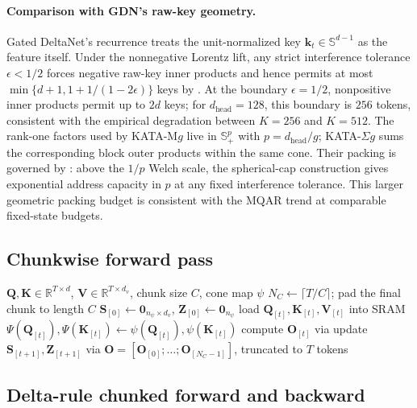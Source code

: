 \documentclass{article}
\newcommand{\1}{\bm{1}}
\def\eps{{\epsilon}}
\def\vk{{\bm{k}}}
\def\mK{{\bm{K}}}
\def\mO{{\bm{O}}}
\def\mQ{{\bm{Q}}}
\def\mS{{\bm{S}}}
\def\mV{{\bm{V}}}
\def\mZ{{\bm{Z}}}
\def\sS{{\mathbb{S}}}
\newcommand{\R}{\mathbb{R}}
\newcommand{\seql}{T}
\theoremstyle{definition}
\begin{document}
\paragraph{Comparison with GDN's raw-key geometry.} Gated DeltaNet's recurrence treats the
unit-normalized key $\vk_t\in\mathbb{S}^{d-1}$ as the feature itself. Under the nonnegative Lorentz
lift, any strict interference tolerance $\eps<1/2$ forces negative raw-key inner products and hence
permits at most $\min\{d+1,1+1/(1-2\eps)\}$ keys by . At the boundary $\eps=1/2$, nonpositive inner
products permit up to $2d$ keys; for $d_\text{head}=128$, this boundary is $256$ tokens, consistent
with the empirical degradation between $K=256$ and $K=512$. The rank-one factors used by KATA-M$g$ live in
$\sS^p_{+}$ with $p=d_\text{head}/g$; KATA-$\Sigma g$ sums the corresponding block outer products within the same cone. Their packing is governed by : above the $1/p$ Welch scale, the spherical-cap construction gives exponential address capacity in $p$ at any fixed interference tolerance. This larger geometric packing budget is consistent with the MQAR trend at comparable fixed-state budgets.

\subsection{Chunkwise forward pass}
\label{app:algorithm}

\begin{algorithm}[ht]
  \caption{KATA chunkwise forward pass for one head and one layer}
  \label{alg:kata}
  \begin{algorithmic}[1]
    \Require $\mQ,\mK\in\R^{\seql\times d}$, $\mV\in\R^{\seql\times d_v}$, chunk size $C$, cone map $\psi$
    \State $N_C\gets\lceil\seql/C\rceil$; pad the final chunk to length $C$
    \State $\mS_{[0]}\gets \mathbf{0}_{n_\psi\times d_v}$,\; $\mZ_{[0]}\gets \mathbf{0}_{n_\psi}$
    \State load $\mQ_{[t]},\mK_{[t]},\mV_{[t]}$ into SRAM
    \State $\Psi(\mQ_{[t]}), \Psi(\mK_{[t]}) \gets \psi(\mQ_{[t]}), \psi(\mK_{[t]})$ 
    \State compute $\mO_{[t]}$ via 
    \State update $\mS_{[t+1]},\mZ_{[t+1]}$ via 
    \EndFor
    \State \Return $\mO = [\mO_{[0]};\dots;\mO_{[N_C-1]}]$, truncated to $\seql$ tokens
  \end{algorithmic}
\end{algorithm}

\subsection{Delta-rule chunked forward and backward}
\label{app:spd-delta}
\end{document}
